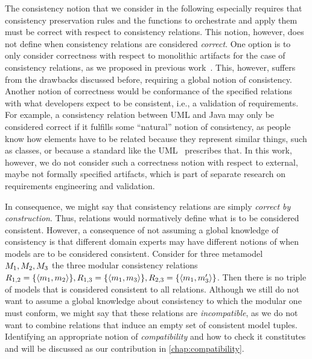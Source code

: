 The consistency notion that we consider in the following especially requires that \glspl{consistency preservation rule} and the functions to orchestrate and apply them must be correct with respect to \glspl{consistency relation}.
This notion, however, does not define when \glspl{consistency relation} are considered \emph{correct}.
One option is to only consider correctness with respect to monolithic artifacts for the case of \glspl{consistency relation}, as we proposed in previous work~\cite{klare2019icmt}.
This, however, suffers from the drawbacks discussed before, requiring a global notion of consistency.
Another notion of correctness would be conformance of the specified relations with what developers expect to be consistent, i.e., a validation of requirements.
For example, a consistency relation between UML and Java may only be considered correct if it fulfills some \enquote{natural} notion of consistency, as people know how elements have to be related because they represent similar things, such as classes, or because a standard like the UML~\cite{uml} prescribes that.
In this work, however, we do not consider such a correctness notion with respect to external, maybe not formally specified artifacts, which is part of separate research on requirements engineering and validation.

In consequence, we might say that \glspl{consistency relation} are simply \emph{correct by construction}.
Thus, relations would normatively define what is to be considered consistent.
However, a consequence of not assuming a global knowledge of consistency is that different domain experts may have different notions of when models are to be considered consistent.
Consider for three metamodel $M_{1}, M_{2}, M_{3}$ the three modular \glspl{consistency relation} $R_{1,2} = \{ \langle m_{1},m_{2} \rangle \}, R_{1,3} = \{ \langle m_{1},m_{3} \rangle \}, R_{2,3} = \{ \langle m_{1},m'_{3} \rangle \}$. 
Then there is no triple of models that is considered consistent to all relations. 
Although we still do not want to assume a global knowledge about consistency to which the modular one must conform, we might say that these relations are \emph{incompatible}, as we do not want to combine relations that induce an empty set of consistent model tuples.
Identifying an appropriate notion of \emph{compatibility} and how to check it constitutes  and will be discussed as our contribution  in \autoref{chap:compatibility}.

